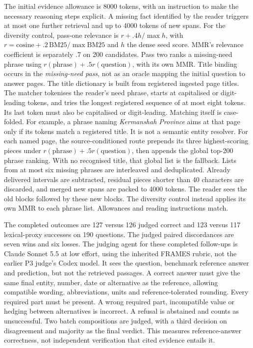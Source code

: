 The initial evidence allowance is 8000 tokens, with an instruction to make the necessary reasoning steps explicit.
A missing fact identified by the reader triggers at most one further retrieval and up to 4000 tokens of new spans.
For the diversity control, pass-one relevance is
\(r+.4h/\max h\), with \(r=\mathrm{cosine}+.2\,\mathrm{BM25}/\max\mathrm{BM25}\) and \(h\) the dense seed score.
MMR's relevance coefficient is separately .7 on 200 candidates.
Pass two ranks a missing-need phrase using \(r(\mathrm{phrase})+.5r(\mathrm{question})\), with its own MMR.
Title binding occurs in the \emph{missing-need pass}, not as an oracle mapping the initial question to answer pages.
The title dictionary is built from registered ingested page titles.
The matcher tokenises the reader's need phrase, starts at capitalised or digit-leading tokens, and tries the longest registered sequence of at most eight tokens.
Its last token must also be capitalised or digit-leading.
Matching itself is case-folded.
For example, a phrase naming \emph{Kermanshah Province} aims at that page only if its tokens match a registered title.
It is not a semantic entity resolver.
For each named page, the source-conditioned route prepends its three highest-scoring pieces under \(r(\mathrm{phrase})+.5r(\mathrm{question})\), then appends the global top-200 phrase ranking.
With no recognised title, that global list is the fallback.
Lists from at most six missing phrases are interleaved and deduplicated.
Already delivered intervals are subtracted, residual pieces shorter than 40 characters are discarded, and merged new spans are packed to 4000 tokens.
The reader sees the old blocks followed by these new blocks.
The diversity control instead applies its own MMR to each phrase list.
Allowances and reading instructions match.

The completed outcomes are 127 versus 126 judged correct and 123 versus 117 lexical-proxy successes on 190 questions.
The judged paired discordances are seven wins and six losses.
The judging agent for these completed follow-ups is Claude Sonnet 5.5 at low effort, using the inherited FRAMES rubric, not the earlier P3 judge's Codex model.
It sees the question, benchmark reference answer and prediction, but not the retrieved passages.
A correct answer must give the same final entity, number, date or alternative as the reference, allowing compatible wording, abbreviations, units and reference-tolerated rounding.
Every required part must be present.
A wrong required part, incompatible value or hedging between alternatives is incorrect.
A refusal is abstained and counts as unsuccessful.
Two batch compositions are judged, with a third decision on disagreement and majority as the final verdict.
This measures reference-answer correctness, not independent verification that cited evidence entails it.

